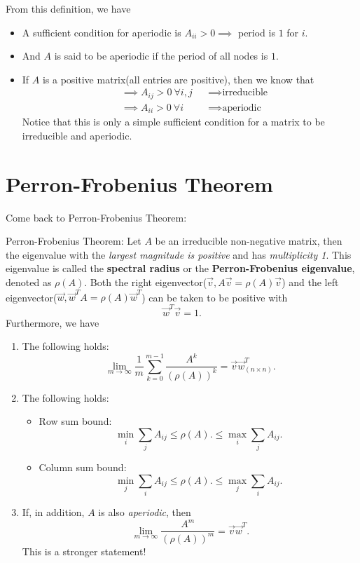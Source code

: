 \begin{remark}
	From this definition, we have
	\begin{itemize}
		\item A sufficient condition for aperiodic is \(A_{ii} > 0 \implies \) period is \(1\) for \(i\).
		\item And \(A\) is said to be aperiodic if the period of all nodes is \(1\).
		\item If \(A\) is a positive matrix(all entries are positive), then we know that
		      \[
			      \begin{alignedat}{3}
				      &\implies A_{ij}>0\ \forall i, j &&\implies \text{irreducible}\\
				      &\implies A_{ii}>0\ \forall i &&\implies \text{aperiodic}
			      \end{alignedat}
		      \]
		      Notice that this is only a simple sufficient condition for a matrix to be irreducible and aperiodic.
	\end{itemize}
\end{remark}

\section{Perron-Frobenius Theorem}
Come back to Perron-Frobenius Theorem:
\begin{theorem}
	\label{Perron-Frobenius Theorem}
	Perron-Frobenius Theorem: Let \(A\) be an irreducible non-negative matrix, then the eigenvalue with the \emph{largest magnitude is positive}
	and has \emph{multiplicity 1}. This eigenvalue is called the \textbf{spectral radius} or the \textbf{Perron-Frobenius eigenvalue},
	denoted as \(\rho(A)\).
	Both the right eigenvector(\(\vec{v}, A \vec{v} = \rho(A) \vec{v}\)) and the left eigenvector(\(\vec{w}, \vec{w}^{T}A = \rho(A) \vec{w}^{T}\))
	can be taken to be positive with
	\[
		\vec{w}^{T} \vec{v} = 1.
	\]
	Furthermore, we have
	\begin{enumerate}
		\item The following holds:
		      \[
			      \lim_{m \to \infty} \frac{1}{m} \sum\limits_{k=0}^{m-1} \frac{A^k}{(\rho(A))^k} = \vec{v} \vec{w}^{T}_{(n\times n)}.
		      \]
		\item The following holds:
		      \begin{itemize}
			      \item Row sum bound:
			            \[
				            \min_i \sum\limits_{j} A_{ij} \leq \rho(A).\leq \max_i \sum\limits_{j} A_{ij}.
			            \]
			      \item Column sum bound:
			            \[
				            \min_j \sum\limits_{i} A_{ij} \leq \rho(A).\leq \max_j \sum\limits_{i} A_{ij}.
			            \]
		      \end{itemize}
		\item If, in addition, \(A\) is also \emph{aperiodic}, then
		      \[
			      \lim_{m \to \infty} \frac{A^m}{(\rho(A))^m} = \vec{v} \vec{w}^{T}.
		      \]
		      This is a stronger statement!
	\end{enumerate}
\end{theorem}

